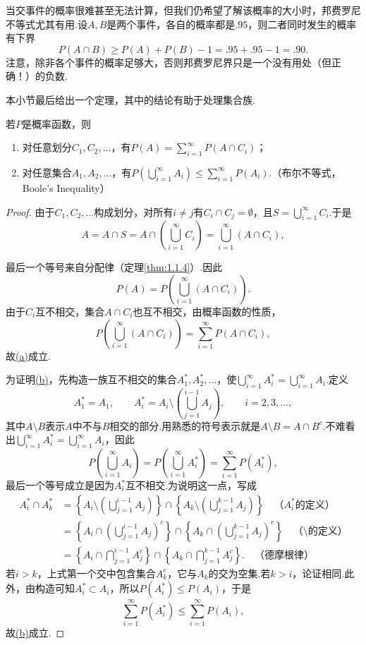 \begin{example}[邦费罗尼不等式]\label{ex:1.2.10}
当交事件的概率很难甚至无法计算，但我们仍希望了解该概率的大小时，邦费罗尼不等式尤其有用.设$A,B$是两个事件，各自的概率都是$.95$，则二者同时发生的概率有下界
$$P(A\cap B)\ge P(A)+P(B)-1=.95+.95-1=.90.$$
注意，除非各个事件的概率足够大，否则邦费罗尼界只是一个没有用处（但正确！）的负数.
\end{example}
本小节最后给出一个定理，其中的结论有助于处理集合族.
\begin{theorem}\label{thm:1.2.11}
若$P$是概率函数，则
\begin{enumerate}
\item[(a)]\label{itm:thm:1.2.11:a} 对任意划分$C_1,C_2,\ldots$，有$P(A)=\sum_{i=1}^{\infty}P(A\cap C_i)$；
\item[(b)]\label{itm:thm:1.2.11:b} 对任意集合$A_1,A_2,\ldots$，有$P(\bigcup_{i=1}^{\infty}A_i)\le\sum_{i=1}^{\infty}P(A_i)$.（布尔不等式，Boole's Inequality）
\end{enumerate}
\end{theorem}
\begin{proof}
由于$C_1,C_2,\ldots$构成划分，对所有$i\ne j$有$C_i\cap C_j=\emptyset$，且$S=\bigcup_{i=1}^{\infty}C_i$.于是
$$A=A\cap S=A\cap\left(\bigcup_{i=1}^{\infty}C_i\right)=\bigcup_{i=1}^{\infty}(A\cap C_i),$$


最后一个等号来自分配律（定理\ref{thm:1.1.4}）.因此
$$P(A)=P\left(\bigcup_{i=1}^{\infty}(A\cap C_i)\right).$$
由于$C_i$互不相交，集合$A\cap C_i$也互不相交，由概率函数的性质，
$$P\left(\bigcup_{i=1}^{\infty}(A\cap C_i)\right)=\sum_{i=1}^{\infty}P(A\cap C_i),$$
故\hyperref[itm:thm:1.2.11:a]{(a)}成立.

为证明\hyperref[itm:thm:1.2.11:b]{(b)}，先构造一族互不相交的集合$A_1^*,A_2^*,\ldots$，使$\bigcup_{i=1}^{\infty}A_i^*=\bigcup_{i=1}^{\infty}A_i$.定义
$$A_1^*=A_1,\qquad A_i^*=A_i\setminus\left(\bigcup_{j=1}^{i-1}A_j\right),\qquad i=2,3,\ldots,$$
其中$A\setminus B$表示$A$中不与$B$相交的部分.用熟悉的符号表示就是$A\setminus B=A\cap B^c$.不难看出$\bigcup_{i=1}^{\infty}A_i^*=\bigcup_{i=1}^{\infty}A_i$，因此
$$P\left(\bigcup_{i=1}^{\infty}A_i\right)=P\left(\bigcup_{i=1}^{\infty}A_i^*\right)=\sum_{i=1}^{\infty}P(A_i^*),$$
最后一个等号成立是因为$A_i^*$互不相交.为说明这一点，写成
$$\begin{aligned}
A_i^*\cap A_k^*
&=\left\{A_i\setminus\left(\bigcup_{j=1}^{i-1}A_j\right)\right\}\cap\left\{A_k\setminus\left(\bigcup_{j=1}^{k-1}A_j\right)\right\}\quad\text{（$A_i^*$的定义）}\\
&=\left\{A_i\cap\left(\bigcup_{j=1}^{i-1}A_j\right)^c\right\}\cap\left\{A_k\cap\left(\bigcup_{j=1}^{k-1}A_j\right)^c\right\}\quad\text{（$\setminus$的定义）}\\
&=\left\{A_i\cap\bigcap_{j=1}^{i-1}A_j^c\right\}\cap\left\{A_k\cap\bigcap_{j=1}^{k-1}A_j^c\right\}.\quad\text{（德摩根律）}
\end{aligned}$$
若$i>k$，上式第一个交中包含集合$A_k^c$，它与$A_k$的交为空集.若$k>i$，论证相同.此外，由构造可知$A_i^*\subset A_i$，所以$P(A_i^*)\le P(A_i)$，于是
$$\sum_{i=1}^{\infty}P(A_i^*)\le\sum_{i=1}^{\infty}P(A_i),$$
故\hyperref[itm:thm:1.2.11:b]{(b)}成立.
\end{proof}
